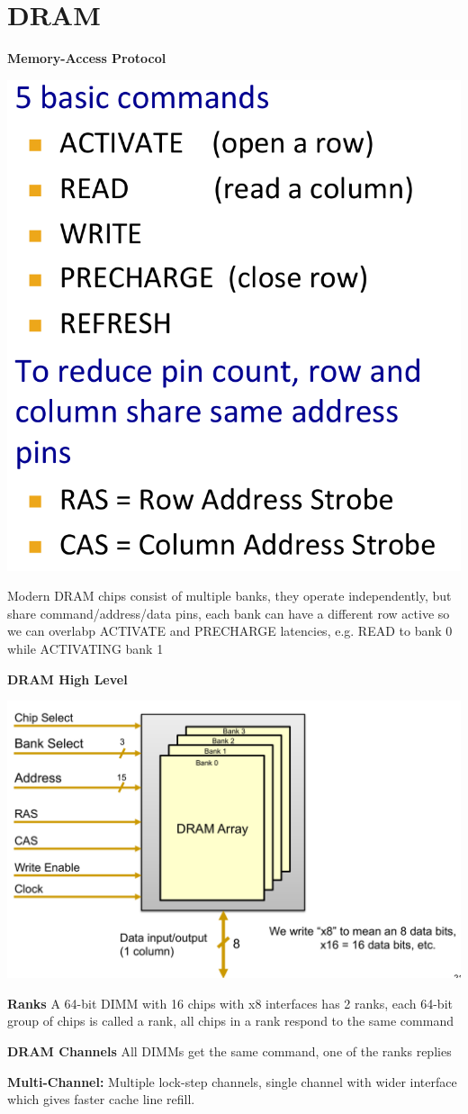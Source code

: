 \section{DRAM}

\textbf{Memory-Access Protocol}

\includegraphics[width=\linewidth]{png/dram.png}

Modern DRAM chips consist of multiple banks, they operate independently, but
share command/address/data pins, each bank can have a different row active so we
can overlabp ACTIVATE and PRECHARGE latencies, e.g. READ to bank 0 while ACTIVATING bank 1

\textbf{DRAM High Level}

\includegraphics[width=\linewidth]{png/drambank.png}

\textbf{Ranks} A 64-bit DIMM with 16 chips with x8 interfaces has 2 ranks, each
64-bit group of chips is called a rank, all chips in a rank respond to the same
command

\textbf{DRAM Channels} All DIMMs get the same command, one of the ranks replies

\textbf{Multi-Channel:} Multiple lock-step channels, single channel with wider
interface which gives faster cache line refill.
